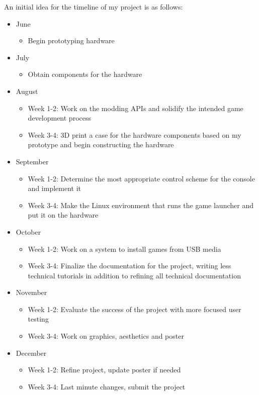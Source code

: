 \documentclass[10pt,twocolumn]{article}
\begin{document}
An initial idea for the timeline of my project is as follows:

\begin{itemize}
    \item June
        \begin{itemize}
            \item Begin prototyping hardware
        \end{itemize}
    \item July
        \begin{itemize}
            \item Obtain components for the hardware
        \end{itemize}
    \item August
        \begin{itemize}
            \item Week 1-2: Work on the modding APIs and solidify the intended
                  game development process
            \item Week 3-4: 3D print a case for the hardware components
                  based on my prototype and begin constructing the hardware
        \end{itemize}
    \item September
        \begin{itemize}
            \item Week 1-2: Determine the most appropriate control scheme for
                  the console and implement it
            \item Week 3-4: Make the Linux environment that runs the game
                  launcher and put it on the hardware
        \end{itemize}
    \item October
        \begin{itemize}
            \item Week 1-2: Work on a system to install games from USB media
            \item Week 3-4: Finalize the documentation for the project, writing
                  less technical tutorials in addition to refining all technical
                  documentation
        \end{itemize}
    \item November
        \begin{itemize}
            \item Week 1-2: Evaluate the success of the project with more
                  focused user testing
            \item Week 3-4: Work on graphics, aesthetics and poster
        \end{itemize}
    \item December
        \begin{itemize}
            \item Week 1-2: Refine project, update poster if needed
            \item Week 3-4: Last minute changes, submit the project
        \end{itemize}
\end{itemize}

\printbibliography

\appendix

\clearpage

\onecolumn
\end{document}

